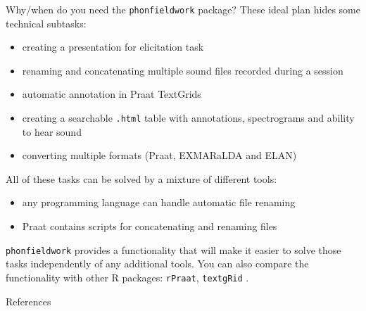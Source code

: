 \documentclass[13pt, t]{beamer}
\begin{document}
\begin{frame}{Why/when do you need the \texttt{phonfieldwork} package?}
These ideal plan hides some technical subtasks:
\begin{itemize}
\item creating a presentation for elicitation task
\item renaming and concatenating multiple sound files recorded during a session
\item automatic annotation in Praat TextGrids {\small \citep{boersma19}}
\item creating a searchable \texttt{.html} table with annotations, spectrograms and ability to hear sound
\item converting multiple formats (Praat, EXMARaLDA and ELAN) \pause
\end{itemize}
\vfill
All of these tasks can be solved by a mixture of different tools:
\begin{itemize}
\item any programming language can handle automatic  file renaming
\item Praat contains scripts for concatenating and renaming files
\end{itemize}
\pause
\vfill
\texttt{phonfieldwork} provides a functionality that will make it easier to solve those tasks independently of any additional tools. You can also compare the functionality with other R packages: \texttt{rPraat}, \texttt{textgRid} \citep{reidy16}.
\end{frame}

\begin{frame}{References}
\footnotesize


\end{frame}
\end{document}
